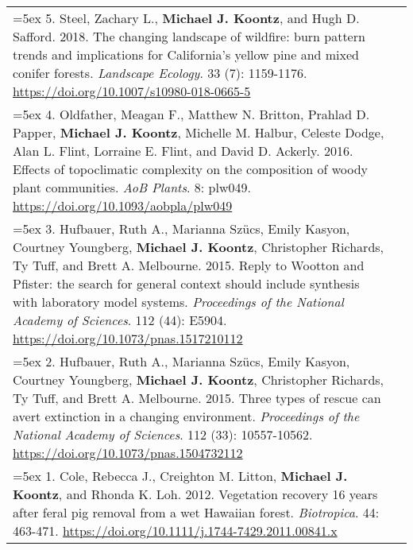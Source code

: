 \begin{longtable}{@{}>{\raggedright}p{6.10in} >{\raggedleft}X @{}}
\hangindent=5ex 5. Steel, Zachary L., \textbf{Michael J. Koontz}, and Hugh D. Safford. 2018. The changing landscape of wildfire: burn pattern trends and implications for California's yellow pine and mixed conifer forests. \emph{Landscape Ecology}. 33 (7): 1159-1176. \href{https://doi.org/10.1007/s10980-018-0665-5}{https://doi.org/10.1007/s10980-018-0665-5} &  \tabularnewline

\hangindent=5ex 4. Oldfather, Meagan F., Matthew N. Britton, Prahlad D. Papper, \textbf{Michael J. Koontz}, Michelle M. Halbur, Celeste Dodge, Alan L. Flint, Lorraine E. Flint, and David D. Ackerly. 2016. Effects of topoclimatic complexity on the composition of woody plant communities. \emph{AoB Plants}. 8: plw049. \href{https://doi.org/10.1093/aobpla/plw049}{https://doi.org/10.1093/aobpla/plw049} & \tabularnewline

\hangindent=5ex 3. Hufbauer, Ruth A., Marianna Sz\"ucs, Emily Kasyon, Courtney Youngberg, \textbf{Michael J. Koontz}, Christopher Richards, Ty Tuff, and Brett A. Melbourne. 2015. Reply to Wootton and Pfister: the search for general context should include synthesis with laboratory model systems. \emph{Proceedings of the National Academy of Sciences}. 112 (44): E5904. \href{https://doi.org/10.1073/pnas.1517210112}{https://doi.org/10.1073/pnas.1517210112} & \tabularnewline

\hangindent=5ex 2. Hufbauer, Ruth A., Marianna Sz\"ucs, Emily Kasyon, Courtney Youngberg, \textbf{Michael J. Koontz}, Christopher Richards, Ty Tuff, and Brett A. Melbourne. 2015. Three types of rescue can avert extinction in a changing environment. \emph{Proceedings of the National Academy of Sciences}. 112 (33): 10557-10562. \href{https://doi.org/10.1073/pnas.1504732112}{https://doi.org/10.1073/pnas.1504732112} &  \tabularnewline

\hangindent=5ex 1. Cole, Rebecca J., Creighton M. Litton, \textbf{Michael J. Koontz}, and Rhonda K. Loh. 2012. Vegetation recovery 16 years after feral pig removal from a wet Hawaiian forest. \emph{Biotropica}. 44: 463-471. \href{https://doi.org/10.1111/j.1744-7429.2011.00841.x}{https://doi.org/10.1111/j.1744-7429.2011.00841.x} &  \tabularnewline

\end{longtable}